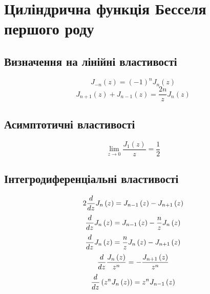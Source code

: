 \chapter{Циліндрична функція Бесселя першого роду}
\label{ch:bessel}

\section{Визначення на лінійні властивості}
%
\begin{equation}
J_{-n} \left( z \right) = \left( -1 \right)^n J_n \left( z \right)
\end{equation}
%
\begin{equation} \label{eq:bessel_order_change}
J_{n+1} \left( z \right) + J_{n-1} \left( z \right) = 
\frac{2n}{z} J_n \left( z \right)
\end{equation}

\section{Асимптотичні властивості}
%
\begin{equation} \label{eq:limJ1toZ}
\lim_{z \to 0} \left. \frac{J_1 \left( z \right)}{z} \right. = \frac{1}{2}
\end{equation}

\section{Інтегродиференціальні властивості}
%
\begin{equation}
2 \frac{d }{d z} J_n \left( z \right) = 
J_{n-1} \left( z \right) - J_{n+1} \left( z \right) 
\end{equation}
%
\begin{equation}
\frac{d }{d z} J_n \left( z \right) = 
J_{n-1} \left( z \right) - \frac{n}{z} J_{n} \left( z \right) 
\end{equation}
%
\begin{equation}
\frac{d }{d z} J_n \left( z \right) = 
\frac{n}{z} J_{n} \left( z \right) - J_{n+1} \left( z \right) 
\end{equation}
%
\begin{equation}
\frac{d }{d z} \frac{ J_n \left( z \right) }{ z^n }  = 
- \frac{ J_{n+1} \left( z \right) }{ z^n }
\end{equation}
%
\begin{equation}
\frac{d }{d z} \left( z^n J_n \left( z \right) \right)  = 
z^n J_{n-1} \left( z \right)
\end{equation}

